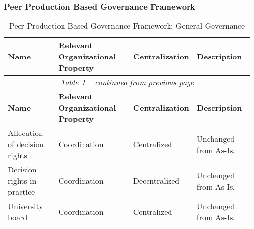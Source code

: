 
\subsubsection*{Peer Production Based Governance Framework}

\begin{center}
\begin{longtable}{ | p{} | p{}| p{} | p{}|}
\caption{Peer Production Based Governance Framework: General Governance} \label{table:peerGeneralGovernance} \\
%
\hline
\textbf{Name} & 
\textbf{Relevant Organizational Property} &
\textbf{Centralization} &  
\textbf{Description} \\ \hline
\endfirsthead
%
\multicolumn{4}{c}{\textit{Table \ref{table:peerGeneralGovernance} -- continued from previous page}} \\  
\hline
\textbf{Name} & 
\textbf{Relevant Organizational Property} &
\textbf{Centralization} &  
\textbf{Description} \\ \hline
\endhead
%
 Allocation of decision rights & 
 Coordination &
 Centralized & 
 Unchanged from As-Is. \\
%
\hline
%
 Decision rights in practice & 
 Coordination &
 Decentralized & 
 Unchanged from As-Is. \\
%
\hline
%
%
%
 University board &
 Coordination &
 Centralized &
 Unchanged from As-Is. \\
%
\hline
%
 

\end{longtable}
\end{center}
